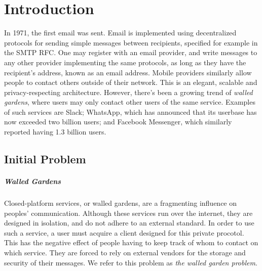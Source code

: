 \chapter{Introduction}
In 1971, the first email was sent\cite{tomlinson2009first}.
Email is implemented using decentralized protocols for sending simple messages between recipients, specified for example in the \ac{SMTP} \ac{RFC}\cite{RFC5321}.
One may register with an email provider, and write messages to any other provider implementing the same protocols, as long as they have the recipient's address, known as an email address.
Mobile providers similarly allow people to contact others outside of their network.
This is an elegant, scalable and privacy-respecting architecture.
However, there's been a growing trend of \textit{walled gardens}\cite{walled_gardens_gunnar_wolf_acm_2018}, where users may only contact other users of the same service.
Examples of such services are Slack\cite{walled_gardens_gunnar_wolf_acm_2018}; WhatsApp, which has announced that its userbase has now exceeded two billion users\cite{whatsapp_2b_users_archive_org}; and Facebook Messenger, which similarly reported having 1.3 billion users\cite{messenger_1pt3b_users}.

\section{Initial Problem}\label{subsec:initial_problem_statement}
\paragraph{Walled Gardens}
Closed-platform services, or walled gardens, are a fragmenting influence on peoples' communication.
Although these services run over the internet, they are designed in isolation, and do not adhere to an external standard.
In order to use such a service, a user must acquire a client designed for this private procotol.
This has the negative effect of people having to keep track of whom to contact on which service.
They are forced to rely on external vendors for the storage and security of their messages.
We refer to this problem as \textit{the walled garden problem}.

